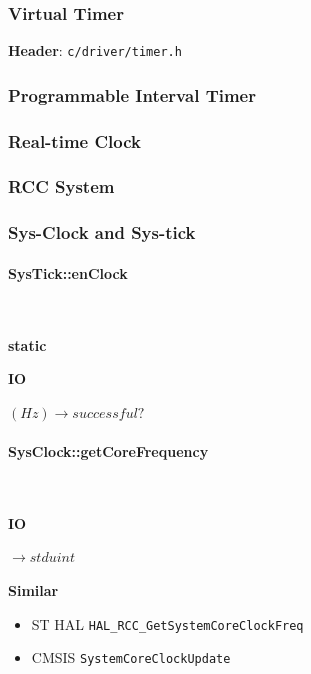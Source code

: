 

\subsubsection{Virtual Timer}

\textbf{Header}: \verb|c/driver/timer.h|



\subsubsection{Programmable Interval Timer}



\subsubsection{Real-time Clock}



\subsubsection{RCC System}



\subsubsection{Sys-Clock and Sys-tick}



\paragraph{SysTick::enClock} \

\textbf{static}

\textbf{IO}

$(Hz) \rightarrow successful?$



\paragraph{SysClock::getCoreFrequency} \

\textbf{IO}

$\rightarrow stduint$

\textbf{Similar}

\begin{itemize}

\item ST HAL \verb|HAL_RCC_GetSystemCoreClockFreq|
\item CMSIS \verb|SystemCoreClockUpdate|
\end{itemize}

